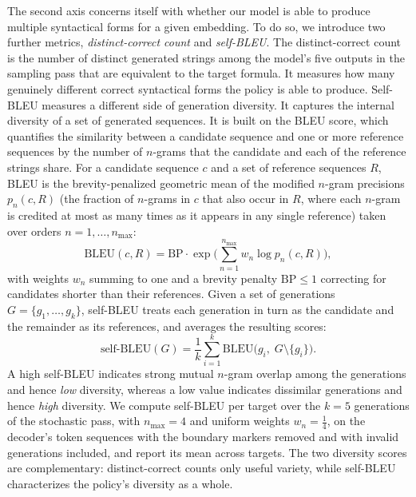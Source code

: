 \documentclass[titlepage,a4paper,11pt]{report}
\begin{document}
    The second axis concerns itself with whether our model is able to produce multiple syntactical forms for a given embedding. To do so, we introduce two further metrics, \textit{distinct-correct count} and \textit{self-BLEU}. The distinct-correct count is the number of distinct generated strings among the model's five outputs in the sampling pass that are equivalent to the target formula. It measures how many genuinely different correct syntactical forms the policy is able to produce. Self-BLEU \citep{zhu_texygen_2018} measures a different side of generation diversity. It captures the internal diversity of a set of generated sequences. It is built on the BLEU score, which quantifies the similarity between a candidate sequence and one or more reference sequences by the number of $n$-grams that the candidate and each of the reference strings share. For a candidate sequence $c$ and a set of reference sequences $R$, BLEU is the brevity-penalized geometric mean of the modified $n$-gram precisions $p_n(c, R)$ (the fraction of $n$-grams in $c$ that also occur in $R$, where each $n$-gram is credited at most as many times as it appears in any single reference) taken over orders $n = 1, \dots, n_{\max}$:
    \begin{equation}
        \text{BLEU}(c, R) = \mathrm{BP}\cdot\exp\!\Big(\textstyle\sum_{n=1}^{n_{\max}} w_n \log p_n(c, R)\Big),
    \end{equation}
    with weights $w_n$ summing to one and a brevity penalty $\mathrm{BP} \le 1$ correcting for candidates shorter than their references. Given a set of generations $G = \{g_1, \dots, g_k\}$, self-BLEU treats each generation in turn as the candidate and the remainder as its references, and averages the resulting scores:
    \begin{equation}
        \text{self-BLEU}(G) = \frac{1}{k}\sum_{i=1}^{k} \text{BLEU}\big(g_i,\; G \setminus \{g_i\}\big).
    \end{equation}
    A high self-BLEU indicates strong mutual $n$-gram overlap among the generations and hence \emph{low} diversity, whereas a low value indicates dissimilar generations and hence \emph{high} diversity. We compute self-BLEU per target over the $k = 5$ generations of the stochastic pass, with $n_{\max}=4$ and uniform weights $w_n = \frac14$, on the decoder's token sequences with the boundary markers removed and with invalid generations included, and report its mean across targets. The two diversity scores are complementary: distinct-correct counts only useful variety, while self-BLEU characterizes the policy's diversity as a whole.
\end{document}
